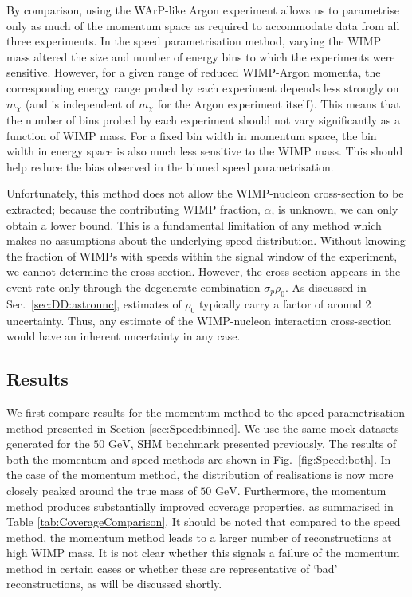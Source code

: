 

By comparison, using the WArP-like Argon experiment allows us to parametrise only as much of the momentum space as required to accommodate data from all three experiments. In the speed parametrisation method, varying the WIMP mass altered the size and number of energy bins to which the experiments were sensitive. However, for a given range of reduced WIMP-Argon momenta, the corresponding energy range probed by each experiment depends less strongly on $m_\chi$ (and is independent of $m_\chi$ for the Argon experiment itself). This means that the number of bins probed by each experiment should not vary significantly as a function of WIMP mass. For a fixed bin width in momentum space, the bin width in energy space is also much less sensitive to the WIMP mass. This should help reduce the bias observed in the binned speed parametrisation.

Unfortunately, this method does not allow the WIMP-nucleon cross-section to be extracted; because the contributing WIMP fraction, \(\alpha\), is unknown, we can only obtain a lower bound. This is a fundamental limitation of any method which makes no assumptions about the underlying speed distribution. Without knowing the fraction of WIMPs with speeds within the signal window of the experiment, we cannot determine the cross-section. However, the cross-section appears in the event rate only through the degenerate combination \(\sigma_p \rho_0\). As discussed in Sec.~\ref{sec:DD:astrounc}, estimates of $\rho_0$ typically carry a factor of around 2 uncertainty. Thus, any estimate of the WIMP-nucleon interaction cross-section would have an inherent uncertainty in any case.

\subsection{Results}

We first compare results for the momentum method to the speed parametrisation method presented in Section \ref{sec:Speed:binned}. We use the same mock datasets generated for the \(50 \textrm{ GeV}\), SHM benchmark presented previously. The results of both the momentum and speed methods are shown in Fig.\ \ref{fig:Speed:both}. In the case of the momentum method, the distribution of realisations is now more closely peaked around the true mass of \(50 \textrm{ GeV}\). Furthermore, the momentum method produces substantially improved coverage properties, as summarised in Table \ref{tab:CoverageComparison}. It should be noted that compared to the speed method, the momentum method leads to a larger number of reconstructions at high WIMP mass. It is not clear whether this signals a failure of the momentum method in certain cases or whether these are representative of `bad' reconstructions, as will be discussed shortly.

